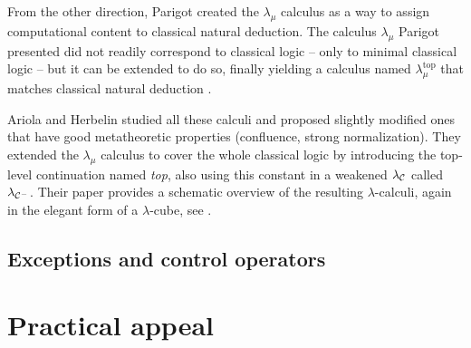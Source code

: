 From the other direction, Parigot created the $\lambda_\mu$ calculus \cite{parigot92}
as a way to assign computational content to classical natural deduction. The calculus
$\lambda_\mu$ Parigot presented did not readily correspond to classical logic --
only to minimal classical logic -- but it can be extended to do so, finally yielding
a calculus named $\lambda_\mu^\mathrm{top}$ that matches classical natural deduction
\cite{ariola-herbelin}.

Ariola and Herbelin studied all these calculi and proposed
slightly modified ones that have good metatheoretic properties (confluence, strong
normalization). They extended the $\lambda_\mu$ calculus to cover the whole classical
logic by introducing the top-level continuation named \emph{top}, also using this constant
in a weakened $\lambda_{\mathcal{C}}$ called $\lambda_{\mathcal{C}^-}$.
Their paper provides a schematic overview of the resulting $\lambda$-calculi, again in the
elegant form of a $\lambda$-cube, see .

\subsection{Exceptions and control operators}




\section{Practical appeal}


\label{chap:dependent-types}






































































